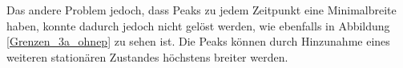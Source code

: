 Das andere Problem jedoch, dass Peaks zu jedem Zeitpunkt eine Minimalbreite haben, konnte dadurch jedoch nicht gelöst werden, wie ebenfalls in Abbildung \ref{Grenzen_3a_ohnep} zu sehen ist. Die Peaks können durch Hinzunahme eines weiteren stationären Zustandes höchstens breiter werden. 


% 

 